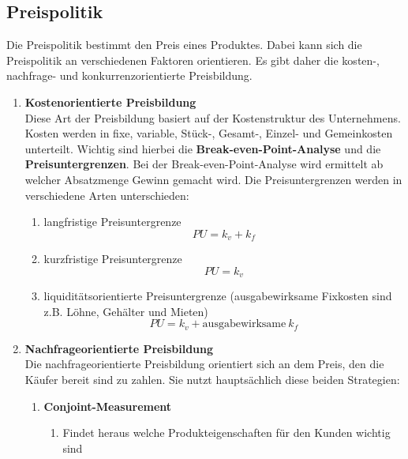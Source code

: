 \subsection{Preispolitik}
\begin{flushleft}
    Die Preispolitik bestimmt den Preis eines Produktes.
    Dabei kann sich die Preispolitik an verschiedenen Faktoren orientieren.
    Es gibt daher die kosten-, nachfrage- und konkurrenzorientierte Preisbildung.
    \begin{enumerate}
        \item {
            \textbf{Kostenorientierte Preisbildung} \\
            Diese Art der Preisbildung basiert auf der Kostenstruktur des Unternehmens.
            Kosten werden in fixe, variable, Stück-, Gesamt-, Einzel- und Gemeinkosten unterteilt.
            Wichtig sind hierbei die \textbf{Break-even-Point-Analyse} und die \textbf{Preisuntergrenzen}.
            Bei der Break-even-Point-Analyse wird ermittelt ab welcher Absatzmenge Gewinn gemacht wird.
            Die Preisuntergrenzen werden in verschiedene Arten unterschieden:
            \begin{enumerate}
                \item {
                    langfristige Preisuntergrenze
                    \[PU=k_v+k_f\]
                }
                \item {
                    kurzfristige Preisuntergrenze
                    \[PU=k_v\]
                }
                \item {
                    liquiditätsorientierte Preisuntergrenze (ausgabewirksame Fixkosten sind z.B. Löhne, Gehälter und Mieten)
                    \[PU=k_v+\text{ausgabewirksame}~k_f\]
                }
            \end{enumerate}
        }
        \item {
            \textbf{Nachfrageorientierte Preisbildung} \\
            Die nachfrageorientierte Preisbildung orientiert sich an dem Preis, den die Käufer bereit sind zu zahlen.
            Sie nutzt hauptsächlich diese beiden Strategien:
            \begin{enumerate}
                \item {
                    \textbf{Conjoint-Measurement} \\
                    \begin{enumerate}
                        \item Findet heraus welche Produkteigenschaften für den Kunden wichtig sind

\end{enumerate}}
\end{enumerate}}
\end{enumerate}
\end{flushleft}
